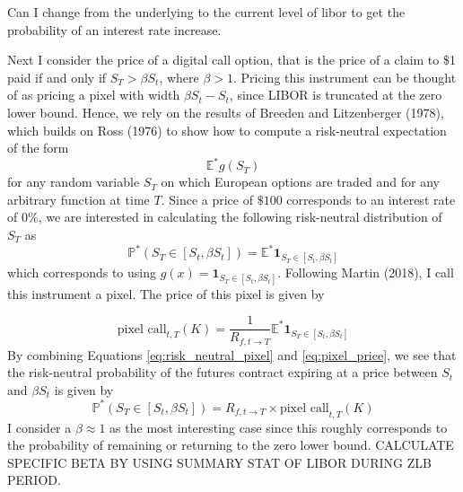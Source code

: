 \documentclass[11pt]{article}
\begin{document}
{\color{pink} Can I change from the underlying to the current level of libor to get the probability of an interest rate increase. }




Next I consider the price of a digital call option, that is the price of a claim to \$1 paid if and only if $S_{T} > \beta S_{t}$, where $\beta > 1$. Pricing this instrument can be thought of as pricing a pixel with width $\beta S_{t} - S_{t}$, since LIBOR is truncated at the zero lower bound. Hence, we rely on the results of Breeden and Litzenberger (1978), which builds on Ross (1976) to show how to compute a risk-neutral expectation of the form
\begin{equation*}
\mathbb{E}^{*} g(S_{T})
\end{equation*}
for any random variable $S_{T}$ on which European options are traded and for any arbitrary function at time $T$.  Since a price of $\$100$ corresponds to an interest rate of $0\%$, we are interested in calculating the following risk-neutral distribution of $S_{T}$ as 
\begin{equation}
\mathbb{P}^{*}(S_{T} \in \left[S_{t}, \beta S_{t} \right]) = \mathbb{E}^{*}\textbf{1}_{S_{T}\in \left[S_{t}, \beta S_{t}\right]}
\label{eq:risk_neutral_pixel}
\end{equation}
which corresponds to using $g(x) = \textbf{1}_{S_{T}\in \left[S_{t}, \beta S_{t}\right]}$. Following Martin (2018), I call this instrument a pixel. The price of this pixel is given by 

\begin{equation}
\text{pixel call}_{t, T}(K) = \dfrac{1}{R_{f, t\to T}} \mathbb{E}^{*}\textbf{1}_{S_{T}\in \left[S_{t}, \beta S_{t}\right]}
\label{eq:pixel_price}
\end{equation}
By combining Equations \ref{eq:risk_neutral_pixel} and \ref{eq:pixel_price}, we see that the risk-neutral probability of the futures contract expiring at a price between $S_{t}$ and $\beta S_{t}$ is given by 
\begin{equation*}
\mathbb{P}^{*}(S_{T} \in \left[S_{t}, \beta S_{t} \right]) = R_{f, t\to T} \times \text{pixel call}_{t, T}(K)
\end{equation*}
I consider a $\beta \approx 1$ as the most interesting case since this roughly corresponds to the probability of remaining or returning to the zero lower bound. CALCULATE SPECIFIC BETA BY USING SUMMARY STAT OF LIBOR DURING ZLB PERIOD. \\
\end{document}
